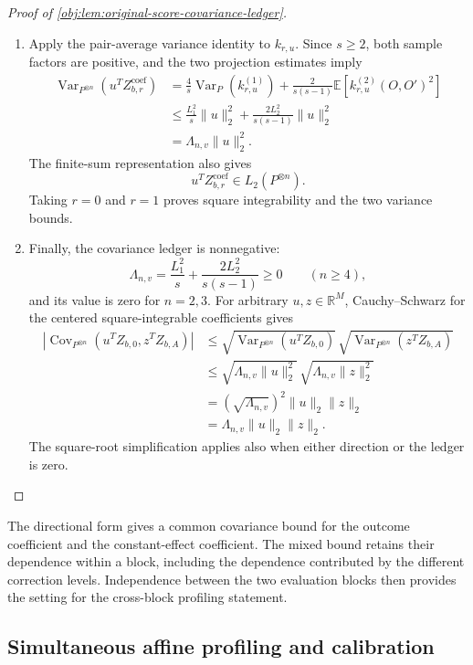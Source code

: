 \documentclass[11pt]{article}
\begin{document}
\begin{proof}[Proof of \cref{obj:lem:original-score-covariance-ledger}]
\begin{enumerate}
\item Apply the pair-average variance identity to \(k_{r,u}\). Since \(s\ge2\), both sample factors are positive, and the two projection estimates imply
\[
\begin{aligned}
\operatorname{Var}_{P^{\otimes n}}(u^TZ_{b,r}^{\mathrm{coef}})
&=
\frac4s\operatorname{Var}_P(k_{r,u}^{(1)})
+
\frac{2}{s(s-1)}
\mathbb E[k_{r,u}^{(2)}(O,O')^2]\\
&\le
\frac{L_1^2}{s}\|u\|_2^2
+
\frac{2L_2^2}{s(s-1)}\|u\|_2^2\\
&=
\Lambda_{n,v}\|u\|_2^2.
\end{aligned}
\]
The finite-sum representation also gives
\[
u^TZ_{b,r}^{\mathrm{coef}}\in L_2(P^{\otimes n}).
\]
Taking \(r=0\) and \(r=1\) proves square integrability and the two variance bounds.

\item Finally, the covariance ledger is nonnegative:
\[
\Lambda_{n,v}
=
\frac{L_1^2}{s}
+
\frac{2L_2^2}{s(s-1)}
\ge0
\qquad(n\ge4),
\]
and its value is zero for \(n=2,3\). For arbitrary \(u,z\in\mathbb R^M\), Cauchy--Schwarz for the centered square-integrable coefficients gives
\[
\begin{aligned}
\left|
\operatorname{Cov}_{P^{\otimes n}}
(u^TZ_{b,0},z^TZ_{b,A})
\right|
&\le
\sqrt{\operatorname{Var}_{P^{\otimes n}}(u^TZ_{b,0})}\,
\sqrt{\operatorname{Var}_{P^{\otimes n}}(z^TZ_{b,A})}\\
&\le
\sqrt{\Lambda_{n,v}\|u\|_2^2}\,
\sqrt{\Lambda_{n,v}\|z\|_2^2}\\
&=
(\sqrt{\Lambda_{n,v}})^2\|u\|_2\|z\|_2\\
&=
\Lambda_{n,v}\|u\|_2\|z\|_2.
\end{aligned}
\]
The square-root simplification applies also when either direction or the ledger is zero.
\end{enumerate}
\end{proof}

The directional form gives a common covariance bound for the outcome coefficient and the constant-effect coefficient. The mixed bound retains their dependence within a block, including the dependence contributed by the different correction levels. Independence between the two evaluation blocks then provides the setting for the cross-block profiling statement.

\subsection{Simultaneous affine profiling and calibration}
\end{document}
